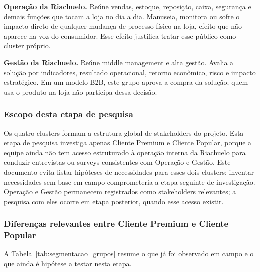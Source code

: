\textbf{Operação da Riachuelo.} Reúne vendas, estoque, reposição, caixa, segurança e demais funções que tocam a loja no dia a dia. Manuseia, monitora ou sofre o impacto direto de qualquer mudança de processo físico na loja, efeito que não aparece na voz do consumidor. Esse efeito justifica tratar esse público como cluster próprio.

\textbf{Gestão da Riachuelo.} Reúne middle management e alta gestão. Avalia a solução por indicadores, resultado operacional, retorno econômico, risco e impacto estratégico. Em um modelo B2B, este grupo aprova a compra da solução; quem usa o produto na loja não participa dessa decisão.

\subsubsection{Escopo desta etapa de pesquisa}
\label{subsubsec:segmentacao_escopo}

Os quatro clusters formam a estrutura global de stakeholders do projeto. Esta etapa de pesquisa investiga apenas Cliente Premium e Cliente Popular, porque a equipe ainda não tem acesso estruturado à operação interna da Riachuelo para conduzir entrevistas ou surveys consistentes com Operação e Gestão. Este documento evita listar hipóteses de necessidades para esses dois clusters: inventar necessidades sem base em campo comprometeria a etapa seguinte de investigação. Operação e Gestão permanecem registrados como stakeholders relevantes; a pesquisa com eles ocorre em etapa posterior, quando esse acesso existir.

\subsubsection{Diferenças relevantes entre Cliente Premium e Cliente Popular}
\label{subsubsec:segmentacao_diferencas}

A Tabela~\ref{tab:segmentacao_grupos} resume o que já foi observado em campo e o que ainda é hipótese a testar nesta etapa.

